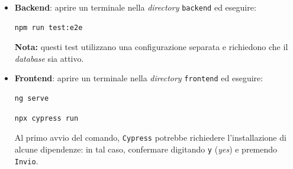 \documentclass[10pt, letterpaper]{article}
\begin{document}
\begin{itemize}
      \item \textbf{Backend}: aprire un terminale nella \textit{directory} \texttt{backend} ed eseguire:
      \begin{verbatim}npm run test:e2e\end{verbatim}

      \textbf{Nota:} questi test utilizzano una configurazione separata e richiedono che il \textit{database} sia attivo.
      \item  \textbf{Frontend}: aprire un terminale nella \textit{directory} \texttt{frontend} ed eseguire:
      \begin{verbatim}ng serve\end{verbatim}
      \begin{verbatim}npx cypress run\end{verbatim}
      Al primo avvio del comando, \texttt{Cypress} potrebbe richiedere l'installazione di alcune dipendenze: in tal caso, confermare digitando \texttt{y} (\textit{yes}) e premendo \texttt{Invio}.
\end{itemize}
\end{document}
